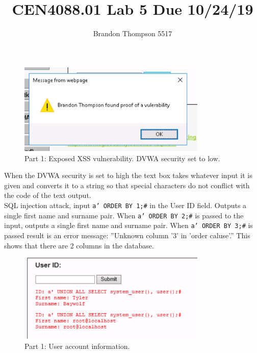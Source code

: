 \documentclass[a4paper]{article}
\begin{document}
	\title{CEN4088.01 Lab 5 Due 10/24/19}
	\author{Brandon Thompson 5517}
	\maketitle

	\begin{figure}[ht!]
		\centering
		\includegraphics[width=0.8\textwidth]{1_2_5}
		\caption{Part 1: Exposed XSS vulnerability. DVWA security set to low.}
		\label{fig:1_2_5}
	\end{figure}
	When the DVWA security is set to high the text box takes whatever input it is
	given and converts it to a string so that special characters do not conflict
	with the code of the text output.\\
	
	SQL injection attack, input \texttt{a' ORDER BY 1;\#} in the User ID field.
	Outputs a single first name and surname pair. When \texttt{a' ORDER BY 2;\#}
	is passed to the input, outputs a single first name and surname pair.
	When \texttt{a' ORDER BY 3;\#} is passed result is an error message:
	''Unknown column '3' in 'order caluse'.'' This shows that there are 2 columns
	in the database.
	\begin{figure}[ht!]
		\centering
		\includegraphics[width=0.8\textwidth]{1_3_19}
		\caption{Part 1: User account information.}
		\label{fig:1_3_19}
	\end{figure}
\end{document}
